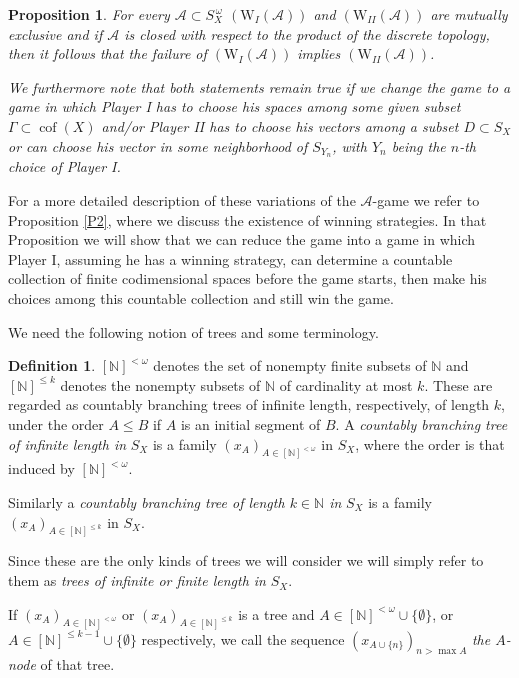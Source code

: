 \documentclass[11pt,leqno]{amsart}
\newtheorem{prop}[thm]{Proposition}
\theoremstyle{definition}
\newtheorem*{defin}{Definition}
\newcommand{\cof}{\operatorname{cof}}
\newcommand{\cA}{\mathcal{A}}
\newcommand{\N}{\mathbb{N}}
\newcommand{\fN}{[\N]^{<\omega}}
\newcommand{\kN}{[\N]^{\le k}}
\begin{document}
\begin{prop}\label{P1}
For every $\cA\subset S_X^{\,\omega}$  
$(\text{W}_{I}(\cA))$ and  $(\text{W}_{II}(\cA))$ are mutually exclusive
and if $\cA$ is closed with respect to the product  of the discrete topology,
then it follows that the failure of  $(\text{W}_{I}(\cA))$ 
implies $(\text{W}_{II}(\cA))$.
  
We furthermore note that both statements remain 
true if we change the game to a game
in which Player I has to choose his spaces  among some given subset 
$\Gamma\subset\cof(X)$ and/or
Player II has to choose his vectors among a subset 
$D\subset S_X$ or can choose
his vector in some neighborhood of $S_{Y_n}$, 
with $Y_n$ being the $n$-th choice of Player I.
\end{prop}

For a more detailed description of these variations of the 
$\cA$-game we refer to Proposition
\ref{P2}, where we discuss the existence of winning strategies.
In that Proposition we will show that we can reduce the 
game into a game in which Player I,
assuming he has a winning strategy, can  determine a countable collection 
of finite codimensional spaces before the game starts,
then make his choices among this countable collection and still win the game.
  
We need the following notion of trees and some terminology.
  
\begin{defin} 
$[\N]^{<\omega}$ denotes the set of nonempty finite subsets of $\N$ and 
$[\N]^{\le k}$ denotes the nonempty subsets of $\N$ of cardinality at 
most $k$. 
These are regarded as countably branching trees of infinite length, 
respectively, of length $k$, under the order $A\le B$ if $A$ is an initial 
segment of $B$. 
A {\em countably branching tree of infinite length in\/} $S_X$ is a family
$(x_A)_{A\in\fN}$ in $S_X$, where the order is that induced by $\fN$.  
\end{defin}
  
Similarly a 
{\em countably branching tree of  length $k\in\N$ in\/} $S_X$ is a family
$(x_A)_{A\in\kN}$ in $S_X$. 
  
Since these are the only kinds of trees we will consider we will simply 
refer to them as 
{\em trees of infinite or finite length in\/} $S_X$.
 
If  $(x_A)_{A\in\fN}$ or $(x_A)_{A\in\kN}$ is a tree and 
$A\in\fN\cup\{\emptyset\}$, or 
$A\in[\N]^{\le k-1}\cup\{\emptyset\}$ respectively,
we call  the sequence $(x_{A\cup\{n\}})_{n>\max A}$
{\em the $A$-node\/} of that tree.
 
\end{document}

